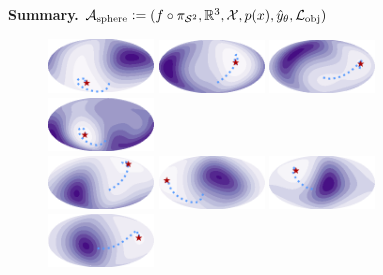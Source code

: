 \textbf{Summary.}
${\mathcal{A}}_{\rm sphere}\vcentcolon= (f\circ \pi_{{\mathcal{S}}^2}, \mathbb{R}^3, {\mathcal{X}}, p(x), \hat y_\theta, {\mathcal{L}}_{\rm obj})$

\begin{figure}
  \includegraphics[width=0.25\textwidth]{fig/sphere/0.png}
  \hspace{-2.7mm}
  \includegraphics[width=0.25\textwidth]{fig/sphere/1.png}
  \hspace{-2.7mm}
  \includegraphics[width=0.25\textwidth]{fig/sphere/2.png}
  \hspace{-2.7mm}
  \includegraphics[width=0.25\textwidth]{fig/sphere/3.png} \\[-.8mm]
  \includegraphics[width=0.25\textwidth]{fig/sphere/4.png}
  \hspace{-2.7mm}
  \includegraphics[width=0.25\textwidth]{fig/sphere/5.png}
  \hspace{-2.7mm}
  \includegraphics[width=0.25\textwidth]{fig/sphere/6.png}
  \hspace{-2.7mm}
  \includegraphics[width=0.25\textwidth]{fig/sphere/7.png} \\[-6mm]

\end{figure}
